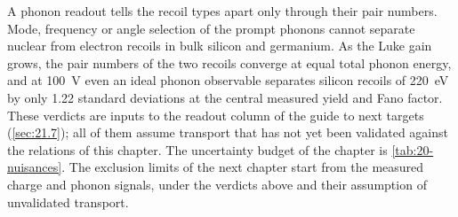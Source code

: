 A phonon readout tells the recoil types apart only through their pair numbers. Mode, frequency or angle selection of the prompt phonons cannot separate nuclear from electron recoils in bulk silicon and germanium. As the Luke gain grows, the pair numbers of the two recoils converge at equal total phonon energy, and at \SI{100}{V} even an ideal phonon observable separates silicon recoils of \SI{220}{eV} by only 1.22 standard deviations at the central measured yield and Fano factor. These verdicts are inputs to the readout column of the guide to next targets (\cref{sec:21.7}); all of them assume transport that has not yet been validated against the relations of this chapter. The uncertainty budget of the chapter is \cref{tab:20-nuisances}. The exclusion limits of the next chapter start from the measured charge and phonon signals, under the verdicts above and their assumption of unvalidated transport.
